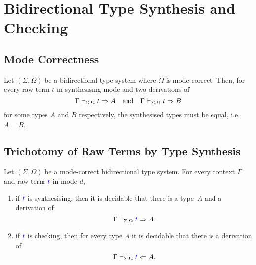 
\section{Bidirectional Type Synthesis and Checking} \label{sec:type-synthesis}

\subsection{Mode Correctness}
\begin{definition}
\end{definition}


\begin{theorem}\label{thm:unique-syn}
  Let $(\Sigma, \Omega)$ be a bidirectional type system where $\Omega$ is mode-correct.
  Then, for every raw term $t$ in synthesising mode and two derivations of 
  \[
    \Gamma \vdash_{\Sigma, \Omega} t \Rightarrow A
    \quad\text{and}\quad
    \Gamma \vdash_{\Sigma, \Omega} t \Rightarrow B
  \]
  for some types $A$ and $B$ respectively, the synthesised types must be equal, i.e.\ $A = B$.
\end{theorem}
 

\subsection{Trichotomy of Raw Terms by Type Synthesis}

\begin{theorem} \label{thm:bidirectional-type-synthesis}
  Let $(\Sigma, \Omega)$ be a mode-correct bidirectional type system.
  For every context $\Gamma$ and raw term ${\textcolor{blue}{t}}$ in mode $d$, 
  \begin{enumerate}
    \item if ${\textcolor{blue}{t}}$ is synthesising, then it is decidable that there is a type~$A$ and a derivation of
      \[
        \Gamma \vdash_{\Sigma, \Omega} {\textcolor{blue}{t}} \Rightarrow A.
      \]
    \item if ${\textcolor{blue}{t}}$ is checking, then for every type $A$ it is decidable that there is a derivation of
      \[
        \Gamma \vdash_{\Sigma, \Omega} {\textcolor{blue}{t}} \Leftarrow A.
      \]
  \end{enumerate}
\end{theorem}

